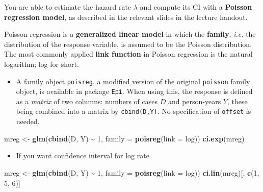 \documentclass[
]{book}
\newenvironment{Shaded}{\begin{snugshade}}{\end{snugshade}}
\newcommand{\AttributeTok}[1]{\textcolor[rgb]{0.13,0.29,0.53}{#1}}
\newcommand{\DecValTok}[1]{\textcolor[rgb]{0.00,0.00,0.81}{#1}}
\newcommand{\FunctionTok}[1]{\textcolor[rgb]{0.13,0.29,0.53}{\textbf{#1}}}
\newcommand{\NormalTok}[1]{#1}
\newcommand{\OtherTok}[1]{\textcolor[rgb]{0.56,0.35,0.01}{#1}}
\newcommand{\SpecialCharTok}[1]{\textcolor[rgb]{0.81,0.36,0.00}{\textbf{#1}}}
\providecommand{\tightlist}{%
  \setlength{\itemsep}{0pt}\setlength{\parskip}{0pt}}
\begin{document}
You are able to estimate the hazard rate \(\lambda\) and compute its CI with a \textbf{Poisson regression model}, as described in the relevant slides in the lecture handout.

Poisson regression is a \textbf{generalized linear model} in which the \textbf{family}, \emph{i.e.} the distribution of the response variable, is assumed to be the Poisson distribution. The most commonly applied \textbf{link function}
in Poisson regression is the natural logarithm; log for short.

\begin{itemize}
\tightlist
\item
  A family object \texttt{poisreg}, a modified version of the original \texttt{poisson} family object, is available
  in package \texttt{Epi}. When using this, the response is defined as a \emph{matrix} of two columns: numbers
  of cases \(D\) and person-years \(Y\), these being combined into a matrix by \texttt{cbind(D,Y)}. No specification
  of \texttt{offset} is needed.
\end{itemize}

\begin{Shaded}
\begin{Highlighting}[]
\NormalTok{mreg }\OtherTok{\textless{}{-}} \FunctionTok{glm}\NormalTok{(}\FunctionTok{cbind}\NormalTok{(D, Y) }\SpecialCharTok{\textasciitilde{}} \DecValTok{1}\NormalTok{, }\AttributeTok{family =} \FunctionTok{poisreg}\NormalTok{(}\AttributeTok{link =}\NormalTok{ log))}
\FunctionTok{ci.exp}\NormalTok{(mreg)}
\end{Highlighting}
\end{Shaded}

\begin{itemize}
\tightlist
\item
  If you want confidence interval for log rate
\end{itemize}

\begin{Shaded}
\begin{Highlighting}[]
\NormalTok{mreg }\OtherTok{\textless{}{-}} \FunctionTok{glm}\NormalTok{(}\FunctionTok{cbind}\NormalTok{(D, Y) }\SpecialCharTok{\textasciitilde{}} \DecValTok{1}\NormalTok{, }\AttributeTok{family =} \FunctionTok{poisreg}\NormalTok{(}\AttributeTok{link =}\NormalTok{ log))}
\FunctionTok{ci.lin}\NormalTok{(mreg)[, }\FunctionTok{c}\NormalTok{(}\DecValTok{1}\NormalTok{, }\DecValTok{5}\NormalTok{, }\DecValTok{6}\NormalTok{)]}
\end{Highlighting}
\end{Shaded}
\end{document}
